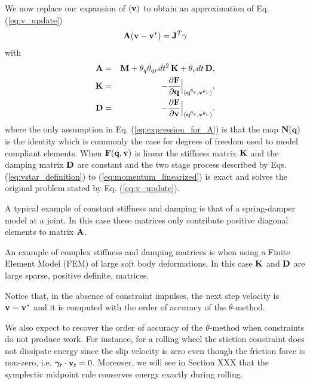 We now replace our expansion of ${\mathbf{(}}{\mathbf{v}})$ to 
obtain an approximation of Eq. (\ref{eq:v_update})
\begin{eqnarray}
	\mf{A}(\mf{v}-\mf{v}^*)= \mf{J}^T\mf{\gamma}
	\label{eq:momentum_linearized}
\end{eqnarray}
with
\begin{eqnarray}
	\mf{A}&=&\mf{M}+\theta_q\theta_{qv} dt^2\,\mf{K}+\theta_v dt\,\mf{D},
	\label{eq:expression_for_A}\\
	\mf{K}&=&-\frac{\partial \mf{F}}{\partial \mf{q}}\Bigr|_{(\mf{q}^{\theta_q}, \mf{v}^{\theta_v})},\\
	\mf{D}&=&-\frac{\partial \mf{F}}{\partial \mf{v}}\Bigr|_{(\mf{q}^{\theta_q},
	\mf{v}^{\theta_v})}.
	\label{eq:dissipation_matrix}
\end{eqnarray}
where the only assumption in Eq. (\ref{eq:expression_for_A}) is that the map
${\mathbf{N}}({\mathbf{q}})$ is the identity  which is commonly the case for degrees of freedom
used to model compliant elements. When ${\mathbf{F}}({\mathbf{q}}, {\mathbf{v}})$ is linear the
stiffness matrix ${\mathbf{K}}$ and the damping matrix ${\mathbf{D}}$ are constant and the
two stage process described by Eqs. (\ref{eq:vstar_definition}) to
(\ref{eq:momentum_linearized}) is exact and solves the original problem stated
by Eq. (\ref{eq:v_update}).




A typical example of constant stiffness and damping is that of a spring-damper
model at a joint. In this case these matrices only contribute positive diagonal
elements to matrix ${\mathbf{A}}$.

An example of complex stiffness and damping matrices is when using a Finite
Element Model (FEM) of large soft body deformations. In this case ${\mathbf{K}}$ and
${\mathbf{D}}$ are large sparse, positive definite, matrices.

Notice that, in the
absence of constraint impulses, the next step velocity is ${\mathbf{v}}={\mathbf{v}}^*$ and
it is computed with the order of accuracy of the $\theta\text{-method}$. 



We also
expect to recover the order of accuracy of the $\theta\text{-method}$ when
constraints do not produce work. For instance, for a rolling wheel the stiction
constraint does not dissipate energy since the slip velocity is zero even though
the friction force is non-zero, i.e. ${\bm\gamma}_t\cdot{\mathbf{v}}_t = 0$. Moreover, we
will see in Section XXX that the symplectic midpoint rule conserves energy
exactly during rolling.

